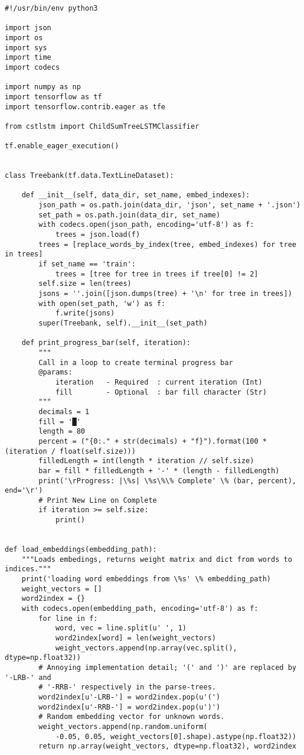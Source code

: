 \begin{lstlisting}[style=app]
#!/usr/bin/env python3

import json
import os
import sys
import time
import codecs

import numpy as np
import tensorflow as tf
import tensorflow.contrib.eager as tfe

from cstlstm import ChildSumTreeLSTMClassifier

tf.enable_eager_execution()


class Treebank(tf.data.TextLineDataset):

    def __init__(self, data_dir, set_name, embed_indexes):
        json_path = os.path.join(data_dir, 'json', set_name + '.json')
        set_path = os.path.join(data_dir, set_name)
        with codecs.open(json_path, encoding='utf-8') as f:
            trees = json.load(f)
        trees = [replace_words_by_index(tree, embed_indexes) for tree in trees]
        if set_name == 'train':
            trees = [tree for tree in trees if tree[0] != 2]
        self.size = len(trees)
        jsons = ''.join([json.dumps(tree) + '\n' for tree in trees])
        with open(set_path, 'w') as f:
            f.write(jsons)
        super(Treebank, self).__init__(set_path)

    def print_progress_bar(self, iteration):
        """
        Call in a loop to create terminal progress bar
        @params:
            iteration   - Required  : current iteration (Int)
            fill        - Optional  : bar fill character (Str)
        """
        decimals = 1
        fill = '█'
        length = 80
        percent = ("{0:." + str(decimals) + "f}").format(100 * (iteration / float(self.size)))
        filledLength = int(length * iteration // self.size)
        bar = fill * filledLength + '-' * (length - filledLength)
        print('\rProgress: |\%s| \%s\%\% Complete' \% (bar, percent), end='\r')
        # Print New Line on Complete
        if iteration >= self.size:
            print()


def load_embeddings(embedding_path):
    """Loads embedings, returns weight matrix and dict from words to indices."""
    print('loading word embeddings from \%s' \% embedding_path)
    weight_vectors = []
    word2index = {}
    with codecs.open(embedding_path, encoding='utf-8') as f:
        for line in f:
            word, vec = line.split(u' ', 1)
            word2index[word] = len(weight_vectors)
            weight_vectors.append(np.array(vec.split(), dtype=np.float32))
        # Annoying implementation detail; '(' and ')' are replaced by '-LRB-' and
        # '-RRB-' respectively in the parse-trees.
        word2index[u'-LRB-'] = word2index.pop(u'(')
        word2index[u'-RRB-'] = word2index.pop(u')')
        # Random embedding vector for unknown words.
        weight_vectors.append(np.random.uniform(
            -0.05, 0.05, weight_vectors[0].shape).astype(np.float32))
        return np.array(weight_vectors, dtype=np.float32), word2index



\end{lstlisting}

